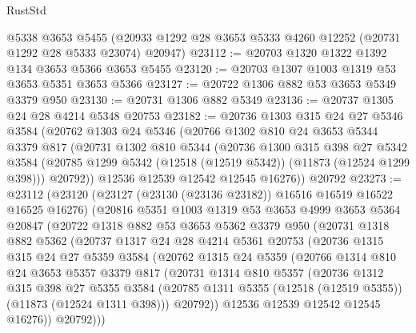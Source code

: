 \begin{lexlean}{RustStd}
\begin{coremodule}
    @5338
    @3653
    @5455
    (@20933 @1292 @28 @3653 @5333 @4260 @12252 (@20731 @1292 @28 @5333 @23074) @20947)
@23112 := @20703 @1320 @1322 @1392 @134 @3653 @5366 @3653 @5455
@23120 := @20703 @1307 @1003 @1319 @53 @3653 @5351 @3653 @5366
@23127 := @20722 @1306 @882 @53 @3653 @5349 @3379 @950
@23130 := @20731 @1306 @882 @5349
@23136 := @20737 @1305 @24 @28 @4214 @5348 @20753
@23182 := @20736
    @1303
    @315
    @24
    @27
    @5346
    @3584
    (@20762
      @1303
      @24
      @5346
      (@20766
        @1302
        @810
        @24
        @3653
        @5344
        @3379
        @817
        (@20731
          @1302
          @810
          @5344
          (@20736
            @1300
            @315
            @398
            @27
            @5342
            @3584
            (@20785 @1299 @5342 (@12518 (@12519 @5342)) (@11873 (@12524 @1299 @398)))
            @20792))
        @12536
        @12539
        @12542
        @12545
        @16276))
    @20792
@23273 := @23112
    (@23120
      (@23127 (@23130 (@23136 @23182)) @16516 @16519 @16522 @16525 @16276)
      (@20816
        @5351
        @1003
        @1319
        @53
        @3653
        @4999
        @3653
        @5364
        @20847
        (@20722
          @1318
          @882
          @53
          @3653
          @5362
          @3379
          @950
          (@20731
            @1318
            @882
            @5362
            (@20737
              @1317
              @24
              @28
              @4214
              @5361
              @20753
              (@20736
                @1315
                @315
                @24
                @27
                @5359
                @3584
                (@20762
                  @1315
                  @24
                  @5359
                  (@20766
                    @1314
                    @810
                    @24
                    @3653
                    @5357
                    @3379
                    @817
                    (@20731
                      @1314
                      @810
                      @5357
                      (@20736
                        @1312
                        @315
                        @398
                        @27
                        @5355
                        @3584
                        (@20785 @1311 @5355 (@12518 (@12519 @5355)) (@11873 (@12524 @1311 @398)))
                        @20792))
                    @12536
                    @12539
                    @12542
                    @12545
                    @16276))
                @20792)))

\end{coremodule}
\end{lexlean}
